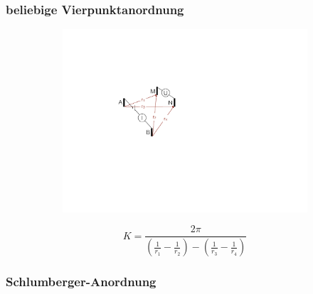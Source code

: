 \subsubsection{beliebige Vierpunktanordnung}

\begin{figure}[H]
	\begin{subfigure}[m]{0.5\textwidth}
	\centering
		\includegraphics[scale = 0.5]{GeoelektrikBilder/beliebigeVierpunktanordnung}
	\end{subfigure}
	\begin{subfigure}[m]{0.5\textwidth}
		\begin{equation*}
			K = \frac{2 \pi}{\left( \frac{1}{r_1} - \frac{1}{r_2} \right) - \left( \frac{1}{r_3} - \frac{1}{r_4} \right)}
		\end{equation*}
	\end{subfigure}
\end{figure}


\subsubsection{Schlumberger-Anordnung}

